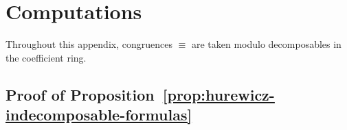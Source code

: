 \documentclass[a4paper]{amsart}
\theoremstyle{plain}
\theoremstyle{definition}
\newtheorem{remark}[subsubsection]{Remark}
\newcommand{\MSp}{\mathbf{MSp}}
\newcommand{\MSL}{\mathbf{MSL}}
\newcommand{\etainv}{\eta^{-1}}
\newcommand{\MSpetainv}{{\MSp[\etainv]}}
\newcommand{\MSLetainv}{{\MSL[\etainv]}}
\newcommand{\W}{\mathcal{W}^{\eta}}
\newcommand{\ZZ}{\mathbb{Z}}
\newcommand{\Rfr}{\mathcal{R}_{\mathrm{fr}}}
\begin{document}

\appendix

\section{Computations}\label{app:gftl-hurewicz-computations}
Throughout this appendix, congruences $\equiv$ are taken modulo decomposables in the coefficient ring.
\subsection{Proof of Proposition~\ref{prop:hurewicz-indecomposable-formulas}}
\end{document}
